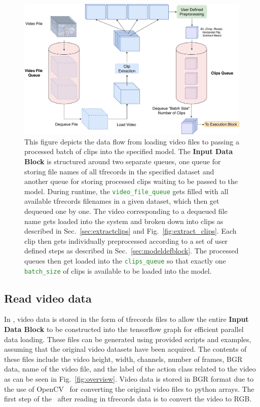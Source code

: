 \documentclass{llncs}
\begin{document}
\begin{figure}[t!]
\centering
\includegraphics[width=1.0\columnwidth]{images/ip_pipeline.pdf}
\caption{This figure depicts the data flow from loading video files to passing a processed batch of clips into the specified model.
The \textbf{Input Data Block} is structured around two separate queues, one queue for storing file names of all tfrecords in the specified dataset and another queue for storing processed clips waiting to be passed to the model.
During runtime, the \texttt{\textcolor{ForestGreen}{video\_file\_queue}} gets filled with all available tfrecords filenames in a given dataset, which then get dequeued one by one.
The video corresponding to a dequeued file name gets loaded into the system and broken down into clips as described in Sec.~\ref{sec:extractclips} and Fig.~\ref{fig:extract_clips}.
Each clip then gets individually preprocessed according to a set of user defined steps as described in Sec.~\ref{sec:modeldefblock}.
The processed queues then get loaded into the \texttt{\textcolor{ForestGreen}{clips\_queue}} so that exactly one \texttt{\textcolor{ForestGreen}{batch\_size}} of clips is available to be loaded into the model.}
\label{fig:ip_block}
\end{figure}


\subsection{Read video data}
\label{sec:readdata}
In \acro, video data is stored in the form of tfrecords files to allow the entire \textbf{Input Data Block} to be constructed into the tensorflow graph for efficient parallel data loading.
These files can be generated using provided scripts and examples, assuming that the original video datasets have been acquired.
The contents of these files include the video height, width, channels, number of frames, BGR data, name of the video file, and the label of the action class related to the video as can be seen in Fig.~\ref{fig:overview}.
Video data is stored in BGR format due to the use of OpenCV~\cite{opencv_library} for converting the original video files to python arrays.
The first step of the \data~after reading in tfrecords data is to convert the video to RGB.
\end{document}
